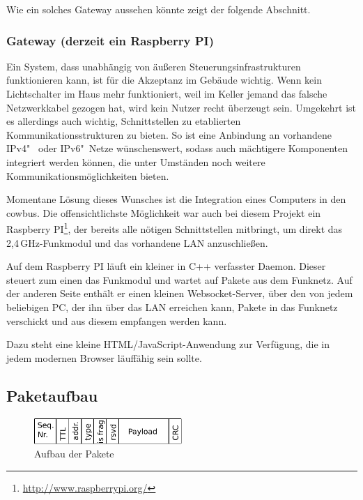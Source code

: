 \documentclass{IEEEtran}
\begin{document}
            Wie ein solches Gateway  aussehen könnte zeigt der folgende Abschnitt.

        \subsubsection{Gateway (derzeit ein Raspberry PI)}
            Ein System, dass unabhängig von äußeren Steuerungsinfrastrukturen
            funktionieren kann, ist für die Akzeptanz im Gebäude wichtig.
            Wenn kein Lichtschalter im Haus mehr funktioniert, weil
            im Keller jemand das falsche Netzwerkkabel gezogen hat,
            wird kein Nutzer recht überzeugt sein.
            Umgekehrt ist es allerdings auch wichtig, Schnittstellen zu
            etablierten Kommunikationsstrukturen zu bieten.
            So ist eine Anbindung an vorhandene IPv4"~ oder IPv6"~Netze
            wünschenswert, sodass auch mächtigere Komponenten integriert werden
            können, die unter Umständen noch weitere Kommunikationsmöglichkeiten
            bieten.

            Momentane Lösung dieses Wunsches ist die Integration eines Computers
            in den cowbus. Die offensichtlichste Möglichkeit war auch bei diesem
            Projekt ein Raspberry PI\footnote{\url{http://www.raspberrypi.org/}},
            der bereits alle nötigen Schnittstellen mitbringt, um direkt das
            2,4\,GHz-Funkmodul und das vorhandene \ac{LAN} anzuschließen.

            Auf dem Raspberry PI läuft ein kleiner in C++ verfasster Daemon.
            Dieser steuert zum einen das Funkmodul und wartet auf Pakete aus
            dem Funknetz.
            Auf der anderen Seite enthält er einen kleinen Websocket-Server,
            über den von jedem beliebigen PC, der ihn über das \ac{LAN}
            erreichen kann, Pakete in das Funknetz verschickt und aus diesem
            empfangen werden kann.

            Dazu steht eine kleine HTML/JavaScript-Anwendung zur Verfügung,
            die in jedem modernen Browser läuffähig sein sollte.

    \subsection{Paketaufbau}
            \begin{figure}
            \centering
            \includegraphics[width=0.5\textwidth]{img/paket}
            \caption{Aufbau der Pakete}
            \label{fig:paket}
        \end{figure}
\end{document}
